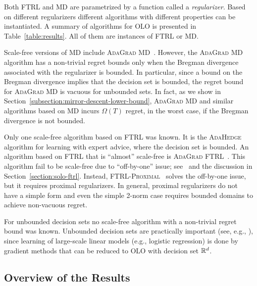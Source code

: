 Both \textsc{FTRL} and \textsc{MD} are parametrized by a function called
a \emph{regularizer}.
Based on different regularizers different algorithms with
different properties can be instantiated. A summary of algorithms for OLO is
presented in Table~\ref{table:results}.  All of them are instances of
\textsc{FTRL} or \textsc{MD}.

Scale-free versions of \textsc{MD} include \textsc{AdaGrad
MD}~\cite{Duchi-Hazan-Singer-2011}. However, the \textsc{AdaGrad MD} algorithm
has a non-trivial regret bounds only when the Bregman divergence associated with
the regularizer is bounded. In particular, since a bound on the Bregman
divergence implies that the decision set is bounded, the regret bound for
\textsc{AdaGrad MD} is vacuous for unbounded sets. In fact, as we show in
Section~\ref{subsection:mirror-descent-lower-bound}, \textsc{AdaGrad MD} and
similar algorithms based on \textsc{MD} incurs $\Omega(T)$ regret, in the worst
case, if the Bregman divergence is not bounded.

Only one scale-free algorithm based on \textsc{FTRL} was known. It is the
\textsc{AdaHedge}~\cite{de-Rooij-van-Erven-Grunwald-Koolen-2014} algorithm for
learning with expert advice, where the decision set is bounded. An algorithm
based on \textsc{FTRL} that is ``almost'' scale-free is \textsc{AdaGrad
FTRL}~\cite{Duchi-Hazan-Singer-2011}.  This algorithm fail to be scale-free due
to ``off-by-one'' issue; see~\cite{McMahan-2014} and the discussion in
Section~\ref{section:solo-ftrl}. Instead,
\textsc{FTRL-Proximal}~\cite{McMahan-Streeter-2010,McMahan-2014} solves the
off-by-one issue, but it requires proximal regularizers. In general, proximal
regularizers do not have a simple form and even the simple 2-norm case requires
bounded domains to achieve non-vacuous regret.

For unbounded decision sets no scale-free algorithm with a non-trivial regret
bound was known. Unbounded decision sets are practically important (see, e.g.,
\cite{Mcmahan-Holt-Sculley-2013}), since learning of large-scale linear models
(e.g., logistic regression) is done by gradient methods that can be reduced to
OLO with decision set $\mathbb{R}^d$.

\subsection{Overview of the Results}

